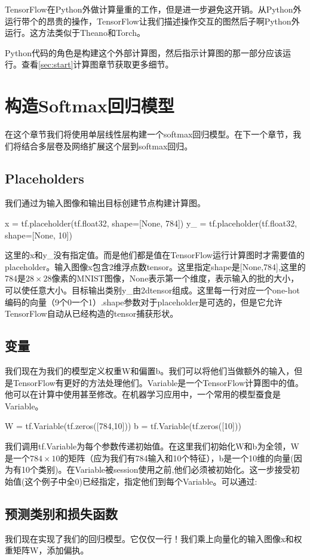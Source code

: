 TensorFlow在Python外做计算量重的工作，但是进一步避免这开销。从Python外运行带个的昂贵的操作，TensorFlow让我们描述操作交互的图然后子啊Python外运行。这方法类似于Theano和Torch。

Python代码的角色是构建这个外部计算图，然后指示计算图的那一部分应该运行。查看\ref{sec:start}计算图章节获取更多细节。
\section{构造Softmax回归模型}
在这个章节我们将使用单层线性层构建一个softmax回归模型。在下一个章节，我们将结合多层卷及网络扩展这个层到softmax回归。
\subsection{Placeholders}
我们通过为输入图像和输出目标创建节点构建计算图。
\begin{pythoncode}
x = tf.placeholder(tf.float32, shape=[None, 784])
y_ = tf.placeholder(tf.float32, shape=[None, 10])
\end{pythoncode}
这里的x和y\_没有指定值。而是他们都是值在TensorFlow运行计算图时才需要值的placeholder。输入图像x包含2维浮点数tensor。这里指定shape是[None,784],这里的784是$28\times28$像素的MNIST图像，None表示第一个维度，表示输入的批的大小，可以使任意大小。目标输出类别y\_由2dtensor组成。这里每一行对应一个one-hot编码的向量（9个0一个1）.shape参数对于placeholder是可选的，但是它允许TensorFlow自动从已经构造的tensor捕获形状。
\subsection{变量}
我们现在为我们的模型定义权重W和偏置b。我们可以将他们当做额外的输入，但是TensorFlow有更好的方法处理他们。Variable是一个TensorFlow计算图中的值。他可以在计算中使用甚至修改。在机器学习应用中，一个常用的模型蚕食是Variable。
\begin{pythoncode}
W = tf.Variable(tf.zeros([784,10]))
b = tf.Variable(tf.zeros([10]))
\end{pythoncode}
我们调用tf.Variable为每个参数传递初始值。在这里我们初始化W和b为全领，W是一个$784\times10$的矩阵（应为我们有784输入和10个特征），b是一个10维的向量(因为有10个类别)。在Variable被session使用之前,他们必须被初始化。这一步接受初始值(这个例子中全0)已经指定，指定他们到每个Variable。可以通过:

\subsection{预测类别和损失函数}
我们现在实现了我们的回归模型。它仅仅一行！我们乘上向量化的输入图像x和权重矩阵W，添加偏执。

